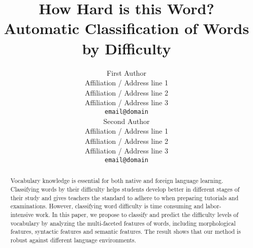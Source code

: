 \documentclass[11pt,a4paper]{article}
\title{How Hard is this Word? Automatic Classification of Words by
Difficulty}
\author{First Author \\
  Affiliation / Address line 1 \\
  Affiliation / Address line 2 \\
  Affiliation / Address line 3 \\
  {\tt email@domain} \\\And
  Second Author \\
  Affiliation / Address line 1 \\
  Affiliation / Address line 2 \\
  Affiliation / Address line 3 \\
  {\tt email@domain} \\}
\date{}
\newcommand{\KZ}[1]{\textcolor{blue}{Kenny: #1}}
\newcommand{\SY}[1]{\textcolor{orange}{Sophie: #1}}
\newcommand{\JQ}[1]{\textcolor{purple}{JQ: #1}}
\begin{document}
\maketitle
\begin{abstract}
Vocabulary knowledge is essential for both native and foreign language 
learning. Classifying words by their difficulty helps students develop
better in different stages of their study and gives teachers the standard
to adhere to when preparing tutorials and examinations.
However, classifying word difficulty is 
	time consuming and labor-intensive work. 
	In this paper, we propose to classify and predict the 
difficulty levels of vocabulary by analyzing the multi-faceted features 
of words, including morphological features, syntactic features and 
semantic features.  The result shows that our method is robust 
against different language environments.  

\end{abstract}









\end{document}

